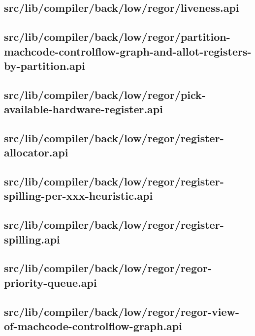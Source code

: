 \subsection{src/lib/compiler/back/low/regor/liveness.api}


\subsection{src/lib/compiler/back/low/regor/partition-machcode-controlflow-graph-and-allot-registers-by-partition.api}


\subsection{src/lib/compiler/back/low/regor/pick-available-hardware-register.api}


\subsection{src/lib/compiler/back/low/regor/register-allocator.api}


\subsection{src/lib/compiler/back/low/regor/register-spilling-per-xxx-heuristic.api}


\subsection{src/lib/compiler/back/low/regor/register-spilling.api}


\subsection{src/lib/compiler/back/low/regor/regor-priority-queue.api}


\subsection{src/lib/compiler/back/low/regor/regor-view-of-machcode-controlflow-graph.api}


